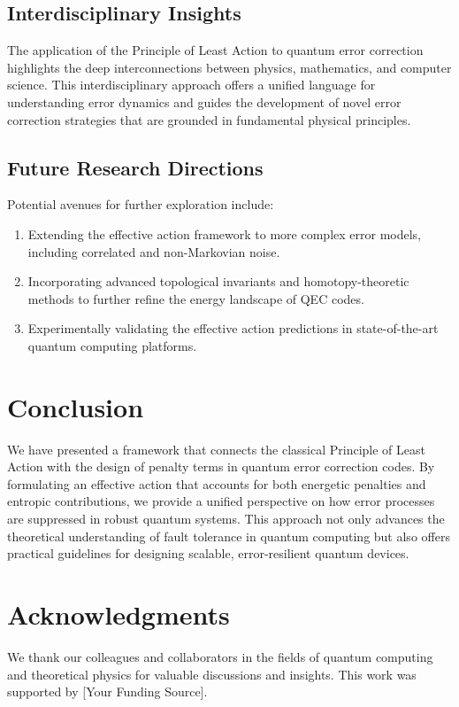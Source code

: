 \documentclass[12pt]{article}
\begin{document}
\subsection{Interdisciplinary Insights}
The application of the Principle of Least Action to quantum error correction highlights the deep interconnections between physics, mathematics, and computer science. This interdisciplinary approach offers a unified language for understanding error dynamics and guides the development of novel error correction strategies that are grounded in fundamental physical principles.

\subsection{Future Research Directions}
Potential avenues for further exploration include:
\begin{enumerate}[label=(\alph*)]
    \item Extending the effective action framework to more complex error models, including correlated and non-Markovian noise.
    \item Incorporating advanced topological invariants and homotopy-theoretic methods to further refine the energy landscape of QEC codes.
    \item Experimentally validating the effective action predictions in state-of-the-art quantum computing platforms.
\end{enumerate}

\section{Conclusion}
We have presented a framework that connects the classical Principle of Least Action with the design of penalty terms in quantum error correction codes. By formulating an effective action that accounts for both energetic penalties and entropic contributions, we provide a unified perspective on how error processes are suppressed in robust quantum systems. This approach not only advances the theoretical understanding of fault tolerance in quantum computing but also offers practical guidelines for designing scalable, error-resilient quantum devices.

\section*{Acknowledgments}
We thank our colleagues and collaborators in the fields of quantum computing and theoretical physics for valuable discussions and insights. This work was supported by [Your Funding Source].
\end{document}
